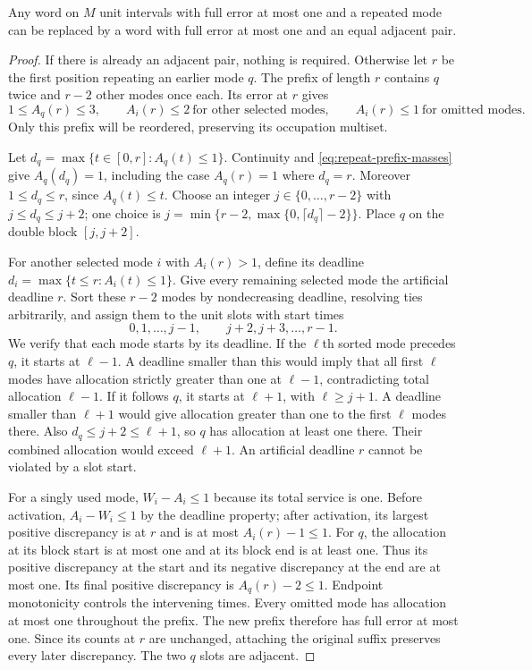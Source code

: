 \begin{lemma}\label{lem:first-repeat}
Any word on $M$ unit intervals with full error at most one and a repeated
mode can be replaced by a word with full error at most one and an equal
adjacent pair.
\end{lemma}
\begin{proof}
If there is already an adjacent pair, nothing is required. Otherwise let
$r$ be the first position repeating an earlier mode $q$. The prefix of
length $r$ contains $q$ twice and $r-2$ other modes once each. Its error
at $r$ gives
\begin{equation}\label{eq:repeat-prefix-masses}
 1\le A_q(r)\le3,\qquad
 A_i(r)\le2\ \text{for other selected modes},\qquad
 A_i(r)\le1\ \text{for omitted modes}.
\end{equation}
Only this prefix will be reordered, preserving its occupation multiset.

Let $d_q=\max\{t\in[0,r]:A_q(t)\le1\}$. Continuity and
\eqref{eq:repeat-prefix-masses} give $A_q(d_q)=1$, including the case
$A_q(r)=1$ where $d_q=r$. Moreover $1\le d_q\le r$, since $A_q(t)\le t$.
Choose an integer $j\in\{0,\ldots,r-2\}$ with $j\le d_q\le j+2$;
one choice is $j=\min\{r-2,\max\{0,\lceil d_q\rceil-2\}\}$.
Place $q$ on the double block $[j,j+2]$.

For another selected mode $i$ with $A_i(r)>1$, define its deadline
$d_i=\max\{t\le r:A_i(t)\le1\}$. Give every remaining selected mode
the artificial deadline $r$. Sort these $r-2$ modes by nondecreasing
deadline, resolving ties arbitrarily, and assign them to the unit slots
with start times
\[
 0,1,\ldots,j-1,\qquad j+2,j+3,\ldots,r-1.
\]
We verify that each mode starts by its deadline. If the $\ell$th sorted
mode precedes $q$, it starts at $\ell-1$. A deadline smaller than this
would imply that all first $\ell$ modes have allocation strictly greater
than one at $\ell-1$, contradicting total allocation $\ell-1$. If it
follows $q$, it starts at $\ell+1$, with $\ell\ge j+1$. A deadline
smaller than $\ell+1$ would give allocation greater than one to the first
$\ell$ modes there. Also $d_q\le j+2\le\ell+1$, so $q$ has allocation
at least one there. Their combined allocation would exceed $\ell+1$.
An artificial deadline $r$ cannot be violated by a slot start.

For a singly used mode, $W_i-A_i\le1$ because its total service is one.
Before activation, $A_i-W_i\le1$ by the deadline property; after
activation, its largest positive discrepancy is at $r$ and is at most
$A_i(r)-1\le1$. For $q$, the allocation at its block start is at most
one and at its block end is at least one. Thus its positive discrepancy
at the start and its negative discrepancy at the end are at most one.
Its final positive discrepancy is $A_q(r)-2\le1$. Endpoint monotonicity
controls the intervening times. Every omitted mode has allocation at most
one throughout the prefix. The new prefix therefore has full error at
most one. Since its counts at $r$ are unchanged, attaching the original
suffix preserves every later discrepancy. The two $q$ slots are adjacent.
\end{proof}

